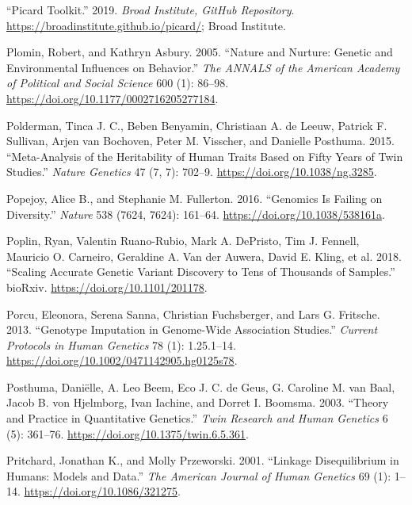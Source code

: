 \documentclass[
]{book}
\newlength{\cslhangindent}
\newlength{\cslentryspacingunit} %
\newenvironment{CSLReferences}[2] %
 {%
  \setlength{\parindent}{0pt}
  \ifodd #1
  \let\oldpar\par
  \def\par{\hangindent=\cslhangindent\oldpar}
  \fi
  \setlength{\parskip}{#2\cslentryspacingunit}
 }%
 {}
\begin{document}
\begin{CSLReferences}{1}{0}
\leavevmode{}%
{``Picard Toolkit.''} 2019. \emph{Broad Institute, GitHub Repository}. \url{https://broadinstitute.github.io/picard/}; Broad Institute.

\leavevmode{}%
Plomin, Robert, and Kathryn Asbury. 2005. {``Nature and {Nurture}: {Genetic} and {Environmental Influences} on {Behavior}.''} \emph{The ANNALS of the American Academy of Political and Social Science} 600 (1): 86--98. \url{https://doi.org/10.1177/0002716205277184}.

\leavevmode{}%
Polderman, Tinca J. C., Beben Benyamin, Christiaan A. de Leeuw, Patrick F. Sullivan, Arjen van Bochoven, Peter M. Visscher, and Danielle Posthuma. 2015. {``Meta-Analysis of the Heritability of Human Traits Based on Fifty Years of Twin Studies.''} \emph{Nature Genetics} 47 (7, 7): 702--9. \url{https://doi.org/10.1038/ng.3285}.

\leavevmode{}%
Popejoy, Alice B., and Stephanie M. Fullerton. 2016. {``Genomics Is Failing on Diversity.''} \emph{Nature} 538 (7624, 7624): 161--64. \url{https://doi.org/10.1038/538161a}.

\leavevmode{}%
Poplin, Ryan, Valentin Ruano-Rubio, Mark A. DePristo, Tim J. Fennell, Mauricio O. Carneiro, Geraldine A. Van der Auwera, David E. Kling, et al. 2018. {``Scaling Accurate Genetic Variant Discovery to Tens of Thousands of Samples.''} {bioRxiv}. \url{https://doi.org/10.1101/201178}.

\leavevmode{}%
Porcu, Eleonora, Serena Sanna, Christian Fuchsberger, and Lars G. Fritsche. 2013. {``Genotype {Imputation} in {Genome-Wide Association Studies}.''} \emph{Current Protocols in Human Genetics} 78 (1): 1.25.1--14. \url{https://doi.org/10.1002/0471142905.hg0125s78}.

\leavevmode{}%
Posthuma, Daniëlle, A. Leo Beem, Eco J. C. de Geus, G. Caroline M. van Baal, Jacob B. von Hjelmborg, Ivan Iachine, and Dorret I. Boomsma. 2003. {``Theory and {Practice} in {Quantitative Genetics}.''} \emph{Twin Research and Human Genetics} 6 (5): 361--76. \url{https://doi.org/10.1375/twin.6.5.361}.

\leavevmode{}%
Pritchard, Jonathan K., and Molly Przeworski. 2001. {``Linkage {Disequilibrium} in {Humans}: {Models} and {Data}.''} \emph{The American Journal of Human Genetics} 69 (1): 1--14. \url{https://doi.org/10.1086/321275}.


\end{CSLReferences}
\end{document}
